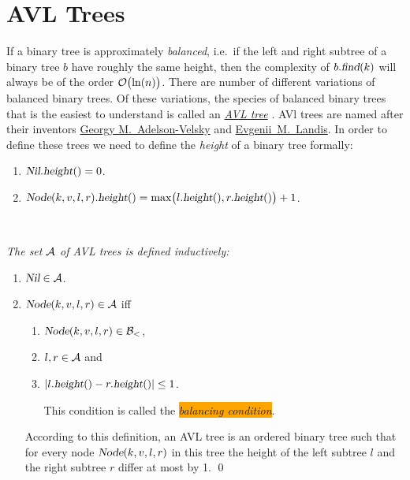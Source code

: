 \section{AVL Trees}
If a binary tree is approximately \emph{balanced}, i.e.~if the left and right subtree of a binary tree $b$  have
roughly the same height, then the complexity of $b.\textsl{find}(k)$ will always be of the order
$\mathcal{O}\bigl(\ln(n)\bigr)$.  There are number of different variations of
balanced binary trees.  Of these variations, the species of balanced binary trees that is the easiest to understand is
called an \href{https://en.wikipedia.org/wiki/AVL_tree}{\emph{AVL tree}} \cite{adelson:62}.  AVl trees are 
named after their inventors \href{https://en.wikipedia.org/wiki/Georgy_Adelson-Velsky}{Georgy M.~Adelson-Velsky} 
and \href{https://en.wikipedia.org/wiki/Evgenii_Landis}{Evgenii~M.~Landis}.  In order to define these 
trees we need to define the \emph{height} of a binary tree formally:
\begin{enumerate}
\item $\textsl{Nil}.\textsl{height}() = 0$.
\item $\textsl{Node}(k,v,l,r).\textsl{height}() = 
       \max\bigl( l.\textsl{height}(), r.\textsl{height}() \bigr) + 1$. \eox
\end{enumerate}

\begin{Definition} \hspace*{\fill} \\
{\em 
  The set $\mathcal{A}$ of \emph{AVL trees} is defined inductively:
  \begin{enumerate}
  \item $\textsl{Nil} \in \mathcal{A}$.
  \item $\textsl{Node}(k,v,l,r) \in \mathcal{A}$ \quad iff 
        \begin{enumerate}
        \item $\textsl{Node}(k,v,l,r) \in \mathcal{B}_<$,
        \item $l, r \in \mathcal{A}$ \quad and
        \item $|l.\textsl{height}() - r.\textsl{height}()| \leq 1$.

              This condition is called the \colorbox{orange}{\emph{balancing condition}}.
        \end{enumerate}
        According to this definition, an AVL tree is an ordered binary tree such that for every node
        $\textsl{Node}(k,v,l,r)$ in this tree the height of the left subtree $l$ and the right
        subtree  $r$ differ at most by 1.  \qed
  \end{enumerate}
}  
\end{Definition}

